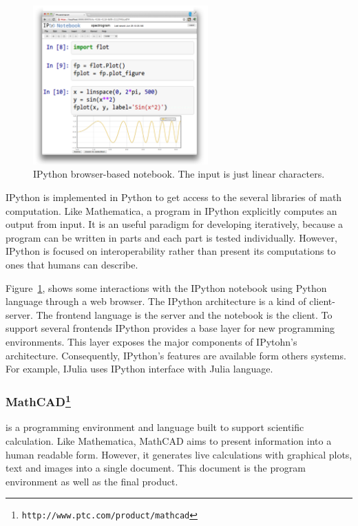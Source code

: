 \begin{figure}
  \vspace{-35pt}
  \begin{center}
    \includegraphics[width=0.6\textwidth]{img/ipython-zoom}
  \end{center}
  \vspace{-25pt}
 \caption{IPython browser-based notebook. The input is just linear characters.}  
  \vspace{-15pt}
    \label{fig:ipython}
\end{figure}

IPython is implemented in Python to get access to the several libraries of math computation. Like Mathematica, a program in IPython explicitly computes an output from input. It is an useful paradigm for developing iteratively, because a program can be written in parts and each part is tested individually. However, IPython is focused on interoperability rather than present its computations to ones that humans can describe.


Figure~\ref{fig:ipython}, shows some interactions with the IPython notebook using Python language through a web browser. The IPython architecture is a kind of client-server. The frontend language is the server and the notebook is the client. To support several frontends IPython provides a base layer for new programming environments. This layer exposes the major components of IPytohn's architecture. Consequently, IPython's features are available form others systems. For example, IJulia uses IPython interface with Julia language. 
\subsubsection{MathCAD\protect\footnote{\texttt{http://www.ptc.com/product/mathcad}}} is a programming environment and language built to support scientific calculation. Like Mathematica, MathCAD aims to present information into a human readable form. However, it generates live calculations with graphical plots, text and images into a single document. This document is the program environment as well as the final product.

